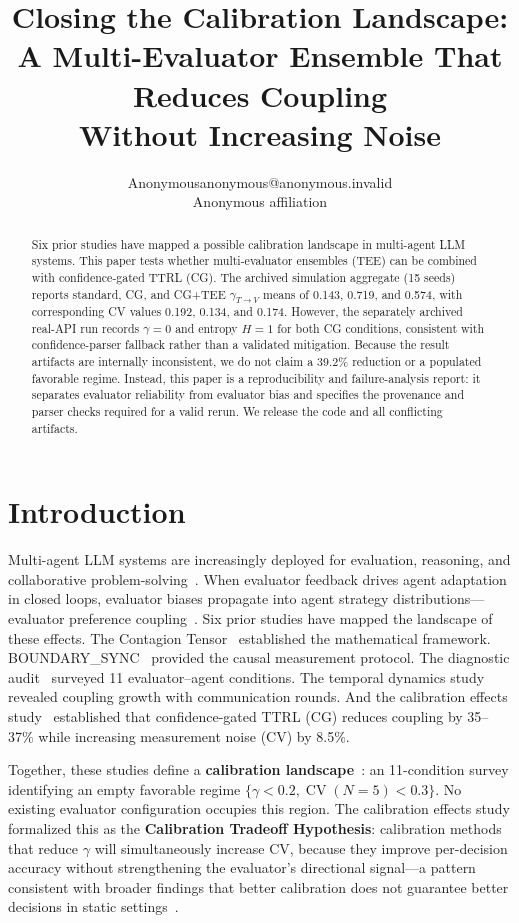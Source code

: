\documentclass[11pt]{article}
\title{Closing the Calibration Landscape: \\ A Multi-Evaluator Ensemble That Reduces Coupling \\ Without Increasing Noise}
\author{\name Anonymous\email anonymous@anonymous.invalid\\\addr Anonymous affiliation}
\date{}
\DeclareMathOperator{\CV}{CV}
\begin{document}
\maketitle

\begin{abstract}
Six prior studies have mapped a possible calibration landscape in multi-agent LLM systems. This paper tests whether multi-evaluator ensembles (TEE) can be combined with confidence-gated TTRL (CG). The archived simulation aggregate (15 seeds) reports standard, CG, and CG+TEE $\gamma_{T\to V}$ means of 0.143, 0.719, and 0.574, with corresponding CV values 0.192, 0.134, and 0.174. However, the separately archived real-API run records $\gamma=0$ and entropy $H=1$ for both CG conditions, consistent with confidence-parser fallback rather than a validated mitigation. Because the result artifacts are internally inconsistent, we do not claim a 39.2\% reduction or a populated favorable regime. Instead, this paper is a reproducibility and failure-analysis report: it separates evaluator reliability from evaluator bias and specifies the provenance and parser checks required for a valid rerun. We release the code and all conflicting artifacts.
\end{abstract}

\newpage

\section{Introduction}

Multi-agent LLM systems are increasingly deployed for evaluation, reasoning, and collaborative problem-solving~\cite{zheng2023judging,chiang2024chatbot,li2023camel,wu2024autogen,snell2024scaling}. When evaluator feedback drives agent adaptation in closed loops, evaluator biases propagate into agent strategy distributions---evaluator preference coupling~\cite{liu2026epc}. Six prior studies have mapped the landscape of these effects. The Contagion Tensor~\cite{liu2026tensor} established the mathematical framework. BOUNDARY\_SYNC~\cite{liu2026boundarysync} provided the causal measurement protocol. The diagnostic audit~\cite{liu2026audit} surveyed 11 evaluator--agent conditions. The temporal dynamics study~\cite{liu2026temporal} revealed coupling growth with communication rounds. And the calibration effects study~\cite{liu2026caleffects} established that confidence-gated TTRL (CG) reduces coupling by 35--37\% while increasing measurement noise (CV) by 8.5\%.

Together, these studies define a \textbf{calibration landscape}~\cite{liu2026caleffects}: an 11-condition survey identifying an empty favorable regime $\{\gamma < 0.2, \CV(N{=}5) < 0.3\}$. No existing evaluator configuration occupies this region. The calibration effects study formalized this as the \textbf{Calibration Tradeoff Hypothesis}: calibration methods that reduce $\gamma$ will simultaneously increase CV, because they improve per-decision accuracy without strengthening the evaluator's directional signal---a pattern consistent with broader findings that better calibration does not guarantee better decisions in static settings~\cite{guo2017calibration,he2026paradox}.
\end{document}
